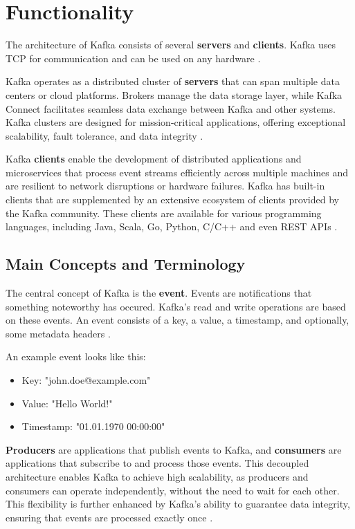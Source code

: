 \section{Functionality}
\label{cha:functionality}

The architecture of Kafka consists of several \textbf{servers} and \textbf{clients}. Kafka uses TCP for communication and can be used on any hardware \cite{kafkaDoc}.

Kafka operates as a distributed cluster of \textbf{servers} that can span multiple data centers or cloud platforms. Brokers manage the data storage layer, while Kafka Connect facilitates seamless data exchange between Kafka and other systems. Kafka clusters are designed for mission-critical applications, offering exceptional scalability, fault tolerance, and data integrity \cite{kafkaDoc}.

Kafka \textbf{clients} enable the development of distributed applications and microservices that process event streams efficiently across multiple machines and are resilient to network disruptions or hardware failures. Kafka has built-in clients that are supplemented by an extensive ecosystem of clients provided by the Kafka community. These clients are available for various programming languages, including Java, Scala, Go, Python, C/C++ and even REST APIs \cite{kafkaDoc}.

\subsection{Main Concepts and Terminology}

The central concept of Kafka is the \textbf{event}. Events are notifications that something noteworthy has occured. Kafka's read and write operations are based on these events. An event consists of a key, a value, a timestamp, and optionally, some metadata headers \cite{kafkaDoc}.

An example event looks like this:

\begin{itemize}
    \item Key: "john.doe@example.com"
    \item Value: "Hello World!"
    \item Timestamp: "01.01.1970 00:00:00"
\end{itemize}

\textbf{Producers} are applications that publish events to Kafka, and \textbf{consumers} are applications that subscribe to and process those events. This decoupled architecture enables Kafka to achieve high scalability, as producers and consumers can operate independently, without the need to wait for each other. This flexibility is further enhanced by Kafka's ability to guarantee data integrity, ensuring that events are processed exactly once \cite{kafkaDoc}.

